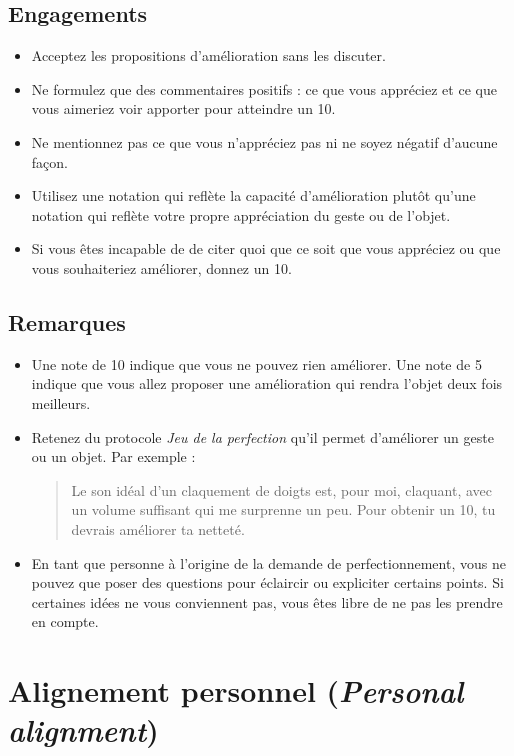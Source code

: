 \documentclass[paper=6in:9in,pagesize=pdftex,headinclude=on,footinclude=on,11pt]{scrbook}
\let\oldsection\section
\renewcommand\section{\clearpage\oldsection}
\begin{document}
\subsection{Engagements}
\begin{itemize}
	\item Acceptez les propositions d'amélioration sans les discuter.
	\item Ne formulez que des commentaires positifs : ce que vous appréciez et ce que vous aimeriez voir apporter pour atteindre un 10.
	\item Ne mentionnez pas ce que vous n'appréciez pas ni ne soyez négatif d'aucune façon.
	\item Utilisez une notation qui reflète la capacité d'amélioration plutôt qu'une notation qui reflète votre propre appréciation du geste ou de l'objet.
	\item Si vous êtes incapable de de citer quoi que ce soit que vous appréciez ou que vous souhaiteriez améliorer, donnez un 10.
\end{itemize}

\subsection{Remarques}
\begin{itemize}
	\item Une note de 10 indique que vous ne pouvez rien améliorer. Une note de 5 indique que vous allez proposer une amélioration qui rendra l'objet deux fois meilleurs.
	\item Retenez du protocole \emph{Jeu de la perfection} qu'il permet d'améliorer un geste ou un objet. Par exemple :
	      \begin{quote}
	      	\og{}Le son idéal d'un claquement de doigts est, pour moi, claquant, avec un volume suffisant qui me surprenne un peu. Pour obtenir un 10, tu devrais
	        améliorer ta netteté.\fg{}
	      \end{quote}
	\item En tant que personne à l'origine de la demande de perfectionnement, vous ne pouvez que poser des questions pour éclaircir ou expliciter certains points.
	      Si certaines idées ne vous conviennent pas, vous êtes libre de ne pas les prendre en compte.
\end{itemize}

\section{Alignement personnel (\emph{Personal alignment})} \label{protocole-alignement-personnel}
\end{document}
